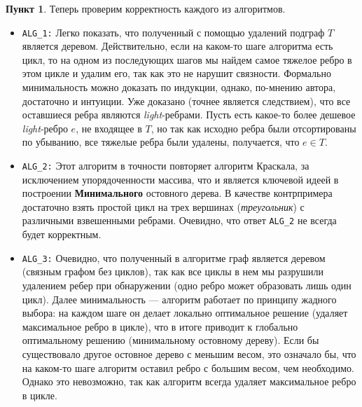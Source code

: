 \documentclass[11pt,a4paper]{scrarticle}
\theoremstyle{definition}
\newtheorem{subtask}{Пункт}
\begin{document}
\begin{subtask}
    Теперь проверим корректность каждого из алгоритмов.

    \begin{itemize}
        \item \texttt{ALG\_1:} Легко показать, что полученный с помощью удалений подграф $T$ является деревом. Действительно, если на каком-то шаге алгоритма есть цикл, то на одном из последующих шагов мы найдем самое тяжелое ребро в этом цикле и удалим его, так как это не нарушит связности. Формально минимальность можно доказать по индукции, однако, по-мнению автора, достаточно и интуиции. Уже доказано (точнее является следствием), что все оставшиеся ребра являются \textit{light}-ребрами. Пусть есть какое-то более дешевое \textit{light}-ребро $e$, не входящее в $T$, но так как исходно ребра были отсортированы по убыванию, все тяжелые ребра были удалены, получается, что $e \in T$.

        \item \texttt{ALG\_2:} Этот алгоритм в точности повторяет алгоритм Краскала, за исключением упорядоченности массива, что и является ключевой идеей в построении \textbf{Минимального} остовного дерева. В качестве контрпримера достаточно взять простой цикл на трех вершинах (\textit{треугольник}) с различными взвешенными ребрами. Очевидно, что ответ \texttt{ALG\_2} не всегда будет корректным.

        \item \texttt{ALG\_3:} Очевидно, что полученный в алгоритме граф является деревом (связным графом без циклов), так как все циклы в нем мы разрушили удалением ребер при обнаружении (одно ребро может образовать лишь один цикл). Далее минимальность — алгоритм работает по принципу жадного выбора: на каждом шаге он делает локально оптимальное решение (удаляет максимальное ребро в цикле), что в итоге приводит к глобально оптимальному решению (минимальному остовному дереву). Если бы существовало другое остовное дерево с меньшим весом, это означало бы, что на каком-то шаге алгоритм оставил ребро с большим весом, чем необходимо. Однако это невозможно, так как алгоритм всегда удаляет максимальное ребро в цикле.
    \end{itemize}
\end{subtask}
\end{document}
